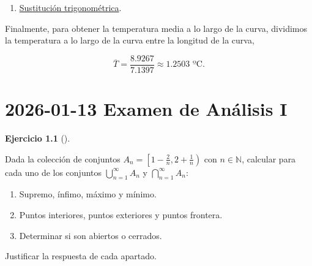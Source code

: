 \documentclass[
  spanish,
  a4paper,
]{scrreport}
\providecommand{\tightlist}{%
  \setlength{\itemsep}{0pt}\setlength{\parskip}{0pt}}
\theoremstyle{definition}
\newtheorem{exercise}{Ejercicio}[chapter]
\theoremstyle{remark}
\begin{document}
\begin{tcolorbox}
\begin{enumerate}
  \begin{enumerate}
  \def\labelenumii{(\arabic{enumii})}
  \tightlist
  \item
    \href{https://en.wikipedia.org/wiki/Trigonometric_substitution\#Example_2_2}{Sustitución
    trigonométrica}.
  \end{enumerate}

  Finalmente, para obtener la temperatura media a lo largo de la curva,
  dividimos la temperatura a lo largo de la curva entre la longitud de
  la curva,

  \[
  \overline{T} = \frac{8.9267}{7.1397} \approx 1.2503 \mbox{ ºC}.
  \]
\end{enumerate}

\end{tcolorbox}


\chapter{\texorpdfstring{2026-01-13 Examen de Análisis
I}{2026-01-13  Examen de Análisis I}}\label{examen-de-anuxe1lisis-i-7}

\begin{exercise}[]\protect\hypertarget{exr-1}{}\label{exr-1}

Dada la colección de conjuntos
\(A_n = \left[1-\frac{2}{n}, 2+\frac{1}{n}\right)\) con
\(n \in \mathbb{N}\), calcular para cada uno de los conjuntos
\(\bigcup_{n=1}^{\infty} A_n\) y \(\bigcap_{n=1}^{\infty} A_n\):

\begin{enumerate}
\def\labelenumi{\alph{enumi}.}
\tightlist
\item
  Supremo, ínfimo, máximo y mínimo.
\item
  Puntos interiores, puntos exteriores y puntos frontera.
\item
  Determinar si son abiertos o cerrados.
\end{enumerate}

Justificar la respuesta de cada apartado.

\end{exercise}
\end{document}
